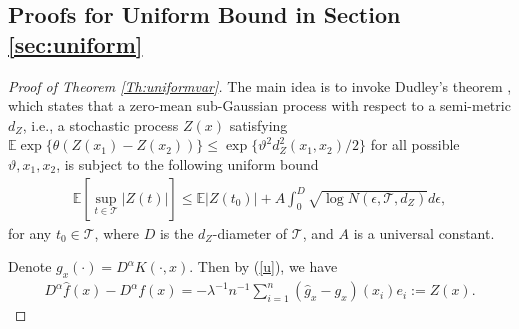 \documentclass[12pt]{article}
\theoremstyle{plain}
\theoremstyle{remark}
\begin{document}
\subsection{Proofs for Uniform Bound in Section \ref{sec:uniform}} \label{sub:uniform}

\begin{proof}[Proof of Theorem \ref{Th:uniformvar}]
The main idea is to invoke Dudley's theorem \citep{VaartWCofEP00,vershynin2018high}, which states that a zero-mean sub-Gaussian process with respect to a semi-metric $d_Z$, i.e., a stochastic process $Z(x)$ satisfying $\mathbb{E}\exp\{\theta(Z(x_1)-Z(x_2))\}\leq \exp\{\vartheta^2 d^2_Z(x_1,x_2)/2\}$ for all possible $\vartheta,x_1,x_2$, is subject to the following uniform bound
\begin{eqnarray}\label{Dudley}  \mathbb{E}\left[\sup_{t\in\mathcal{T}}|Z(t)|\right]\leq \mathbb{E}|Z(t_0)|+ A \int_0^D \sqrt{\log N(\epsilon, \mathcal{T},d_Z)}d\epsilon,
\end{eqnarray}
for any $t_0\in \mathcal{T}$, where $D$ is the $d_Z$-diameter of $\mathcal{T}$, and $A$ is a universal constant.

Denote $g_x(\cdot)=D^\alpha K(\cdot,x)$. Then by (\ref{u}), we have
\begin{eqnarray}\label{Zx}
    D^\alpha \hat{f}(x)-D^\alpha f(x)=-\lambda^{-1}n^{-1}\sum_{i=1}^n (\hat{g}_x-g_x)(x_i)e_i:=Z(x).
\end{eqnarray}


\end{proof}
\end{document}
